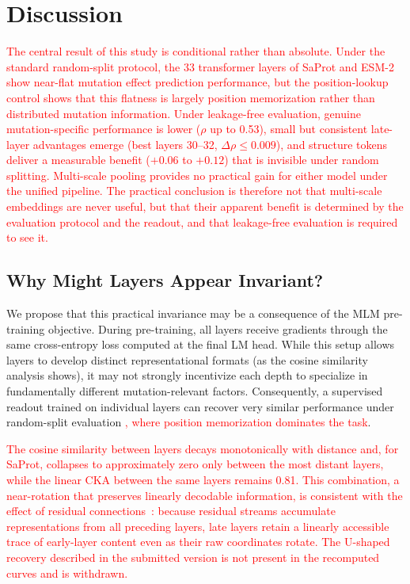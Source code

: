 \documentclass[numbered,webpdf,modern,large]{oup-authoring-template}
\newcommand{\rev}[1]{\textcolor{red}{#1}}
\begin{document}
\section{Discussion}

\rev{The central result of this study is conditional rather than absolute. Under
the standard random-split protocol, the 33 transformer layers of SaProt and ESM-2 show
near-flat mutation effect prediction performance, but the position-lookup control shows
that this flatness is largely position memorization rather than distributed mutation
information. Under leakage-free evaluation, genuine mutation-specific performance is
lower ($\rho$ up to 0.53), small but consistent late-layer advantages emerge (best
layers 30--32, $\Delta\rho \leq 0.009$), and structure tokens deliver a measurable
benefit ($+0.06$ to $+0.12$) that is invisible under random splitting. Multi-scale
pooling provides no practical gain for either model under the unified pipeline. The
practical conclusion is therefore not that multi-scale embeddings are never useful,
but that their apparent benefit is determined by the evaluation protocol and the
readout, and that leakage-free evaluation is required to see it.}

\subsection{Why Might Layers Appear Invariant?}

We propose that this practical invariance may be a consequence of the MLM pre-training
objective. During pre-training, all layers receive gradients through the same
cross-entropy loss computed at the final LM head. While this setup allows layers
to develop distinct representational formats (as the cosine similarity analysis
shows), it may not strongly incentivize each depth to specialize in fundamentally
different mutation-relevant factors. Consequently, a supervised readout trained on
individual layers can recover very similar performance under random-split evaluation
\rev{, where position memorization dominates the task}.

\rev{The cosine similarity between layers decays monotonically with distance and,
for SaProt, collapses to approximately zero only between the most distant layers,
while the linear CKA between the same layers remains 0.81. This combination, a
near-rotation that preserves linearly decodable information, is consistent with the
effect of residual connections~\cite{he2016deep}: because residual streams accumulate
representations from all preceding layers, late layers retain a linearly accessible
trace of early-layer content even as their raw coordinates rotate. The U-shaped
recovery described in the submitted version is not present in the recomputed curves
and is withdrawn.}
\end{document}
